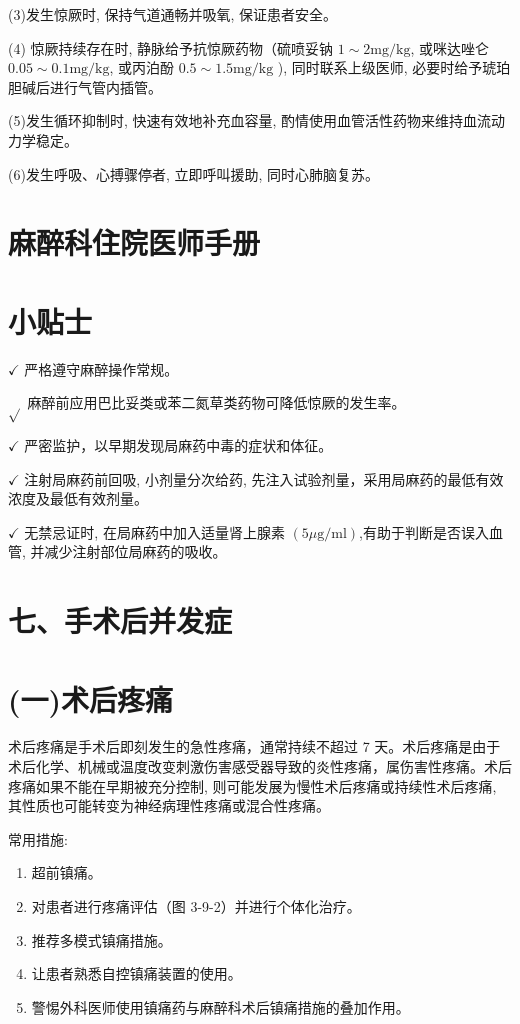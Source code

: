 \documentclass[10pt]{article}
\begin{document}
(3)发生惊厥时, 保持气道通畅并吸氧, 保证患者安全。

(4) 惊厥持续存在时, 静脉给予抗惊厥药物（硫喷妥钠 $1 \sim 2 \mathrm{mg} / \mathrm{kg}$, 或咪达唑仑 $0.05 \sim 0.1 \mathrm{mg} / \mathrm{kg}$, 或丙泊酚 $0.5 \sim 1.5 \mathrm{mg} / \mathrm{kg}$ ), 同时联系上级医师, 必要时给予琥珀胆碱后进行气管内插管。

(5)发生循环抑制时, 快速有效地补充血容量, 酌情使用血管活性药物来维持血流动力学稳定。

(6)发生呼吸、心搏骤停者, 立即呼叫援助, 同时心肺脑复苏。

\section*{麻醉科住院医师手册}
\section*{小贴士}
$\checkmark$ 严格遵守麻醉操作常规。

$\sqrt{ }$ 麻醉前应用巴比妥类或苯二氮草类药物可降低惊厥的发生率。

$\checkmark$ 严密监护，以早期发现局麻药中毒的症状和体征。

$\checkmark$ 注射局麻药前回吸, 小剂量分次给药, 先注入试验剂量，采用局麻药的最低有效浓度及最低有效剂量。

$\checkmark$ 无禁忌证时, 在局麻药中加入适量肾上腺素 $(5 \mu \mathrm{g} / \mathrm{ml})$,有助于判断是否误入血管, 并减少注射部位局麻药的吸收。

\section*{七、手术后并发症}
\section*{(一)术后疼痛}
术后疼痛是手术后即刻发生的急性疼痛，通常持续不超过 7 天。术后疼痛是由于术后化学、机械或温度改变刺激伤害感受器导致的炎性疼痛，属伤害性疼痛。术后疼痛如果不能在早期被充分控制, 则可能发展为慢性术后疼痛或持续性术后疼痛, 其性质也可能转变为神经病理性疼痛或混合性疼痛。

常用措施:

\begin{enumerate}
  \item 超前镇痛。

  \item 对患者进行疼痛评估（图 3-9-2）并进行个体化治疗。

  \item 推荐多模式镇痛措施。

  \item 让患者熟悉自控镇痛装置的使用。

  \item 警惕外科医师使用镇痛药与麻醉科术后镇痛措施的叠加作用。

\end{enumerate}
\end{document}
